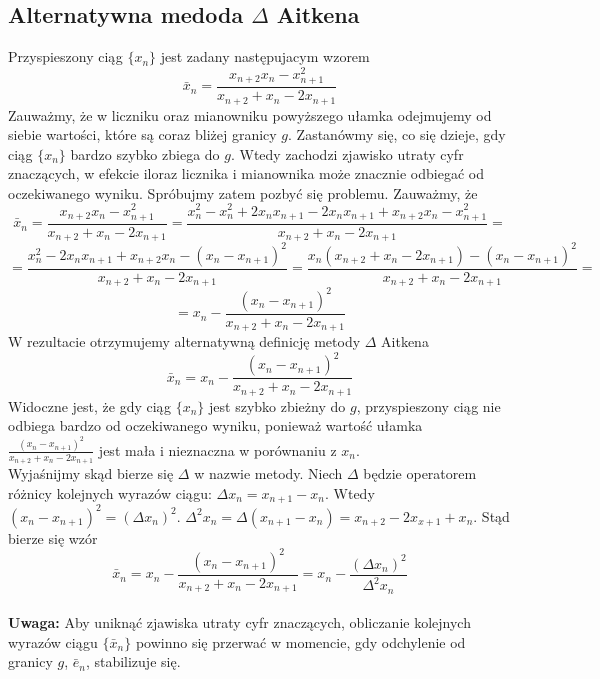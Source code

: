 \documentclass{article}
\begin{document}
\subsection{Alternatywna medoda $\Delta$ Aitkena}
Przyspieszony ciąg $\{x_n\}$ jest zadany następujacym wzorem
\begin{equation*}
\bar{x}_n = \frac{x_{n+2}x_n - x_{n+1}^2}{x_{n+2} + x_n - 2x_{n+1}}
\end{equation*}
Zauważmy, że w liczniku oraz mianowniku powyższego ułamka odejmujemy od siebie wartości, które są coraz bliżej granicy $g$. 
Zastanówmy się, co się dzieje, gdy ciąg $\{x_n\}$ bardzo szybko zbiega do $g$.
Wtedy zachodzi zjawisko utraty cyfr znaczących, w efekcie iloraz licznika i mianownika może znacznie odbiegać od oczekiwanego wyniku.
Spróbujmy zatem pozbyć się problemu. Zauważmy, że
\begin{equation*}
\bar{x}_n = \frac{x_{n+2}x_n - x_{n+1}^2}{x_{n+2} + x_n - 2x_{n+1}} = \frac{x_n^2 - x_n^2 + 2x_{n}x_{n+1} - 2x_{n}x_{n+1} + x_{n+2}x_n - x_{n+1}^2}{x_{n+2} + x_n - 2x_{n+1}} =
\end{equation*}
\begin{equation*}
= \frac{x_n^2 - 2x_{n}x_{n+1} + x_{n+2}x_n - (x_n - x_{n+1})^2}{x_{n+2} + x_n - 2x_{n+1}} = \frac{x_n( x_{n+2} + x_n - 2x_{n+1}) - (x_n - x_{n+1})^2}{x_{n+2} + x_n - 2x_{n+1}} = 
\end{equation*}
\begin{equation*}
= x_n - \frac{(x_n - x_{n+1})^2}{x_{n+2} + x_n - 2x_{n+1}}
\end{equation*}
W rezultacie otrzymujemy alternatywną definicję metody $\Delta$ Aitkena
\begin{equation*}
\bar{x}_n = x_n - \frac{(x_n - x_{n+1})^2}{x_{n+2} + x_n - 2x_{n+1}}
\end{equation*}
Widoczne jest, że gdy ciąg $\{x_n\}$ jest szybko zbieżny do $g$, 
przyspieszony ciąg nie odbiega bardzo od oczekiwanego wyniku, 
ponieważ wartość ułamka $\frac{(x_n - x_{n+1})^2}{x_{n+2} + x_n - 2x_{n+1}}$ jest mała i nieznaczna w porównaniu z $x_n$.\\
Wyjaśnijmy skąd bierze się $\Delta$ w nazwie metody. Niech $\Delta$ będzie operatorem różnicy kolejnych wyrazów ciągu: $\Delta x_n = x_{n+1} - x_n$. Wtedy $(x_n - x_{n+1})^2 = (\Delta x_n)^2$. $\Delta^2 x_n = \Delta (x_{n+1} - x_n) = x_{n+2} - 2x_{x+1} + x_n$. Stąd bierze się wzór
\begin{equation*}
\bar{x}_n = x_n - \frac{(x_n - x_{n+1})^2}{x_{n+2} + x_n - 2x_{n+1}} = x_n - \frac{(\Delta x_n)^2}{\Delta^2 x_n}
\end{equation*}
\\
\textbf{Uwaga:} Aby uniknąć zjawiska utraty cyfr znaczących, obliczanie kolejnych wyrazów ciągu $\{\bar{x}_n\}$ powinno się przerwać w momencie, gdy odchylenie od granicy $g$, $\bar{e}_n$, stabilizuje się.
\end{document}
